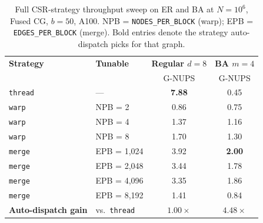 \documentclass[a4paper,fleqn]{cas-sc}
\theoremstyle{definition}
\theoremstyle{remark}
\begin{document}
\begin{table}[!h]
\caption{Full CSR-strategy throughput sweep on ER and BA at $N = 10^6$, Fused CG, $b = 50$, A100. NPB = \texttt{NODES\_PER\_BLOCK} (warp); EPB = \texttt{EDGES\_PER\_BLOCK} (merge). Bold entries denote the strategy auto-dispatch picks for that graph.}
\label{tab:degree_dispatch_sweep}
\centering
\begin{tabular*}{\tblwidth}{@{}llcc@{}}
\toprule
\textbf{Strategy}             & \textbf{Tunable}   & \textbf{Regular $d=8$} & \textbf{BA $m=4$} \\
                              &                    & G-NUPS               & G-NUPS \\
\midrule
\texttt{thread}               & ---                & \textbf{7.88}        & 0.45 \\
\midrule
\texttt{warp}                 & NPB = 2            & 0.86                 & 0.75 \\
\texttt{warp}                 & NPB = 4            & 1.37                 & 1.16 \\
\texttt{warp}                 & NPB = 8            & 1.70                 & 1.30 \\
\midrule
\texttt{merge}                & EPB = 1{,}024      & 3.92                 & \textbf{2.00} \\
\texttt{merge}                & EPB = 2{,}048      & 3.44                 & 1.78 \\
\texttt{merge}                & EPB = 4{,}096      & 3.35                 & 1.86 \\
\texttt{merge}                & EPB = 8{,}192      & 1.41                 & 0.84 \\
\midrule
\textbf{Auto-dispatch gain}    & vs.\ \texttt{thread} & $1.00\times$       & $\mathbf{4.48\times}$ \\
\bottomrule
\end{tabular*}
\end{table}
\end{document}

